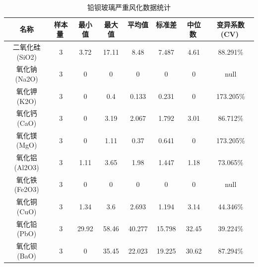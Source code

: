 \documentclass{my_paper}
\begin{document}
\begin{enumerate}
\begin{itemize}
    \begin{longtable}{cccccccc}
    \caption{铅钡玻璃严重风化数据统计}
    \label{index5} \\
    \toprule
        名称                   & 样本量                 & 最小值                  & 最大值                  & 平均值                 & 标准差                 & 中位数                 & 变异系数(CV)            \\
        \midrule
        二氧化硅(SiO2)           & 3                    & 3.72                 & 17.11                & 8.48                 & 7.487                & 4.61                 & 88.291\%             \\
        氧化钠(Na2O)            & 3                    & 0                    & 0                    & 0                    & 0                    & 0                    & null                 \\
        氧化钾(K2O)             & 3                    & 0                    & 0.4                  & 0.133                & 0.231                & 0                    & 173.205\%            \\
        氧化钙(CaO)             & 3                    & 0                    & 3.19                 & 2.067                & 1.792                & 3.01                 & 86.712\%             \\
        氧化镁(MgO)             & 3                    & 0                    & 1.11                 & 0.37                 & 0.641                & 0                    & 173.205\%            \\
        氧化铝(Al2O3)           & 3                    & 1.11                 & 3.65                 & 1.98                 & 1.447                & 1.18                 & 73.065\%             \\
        氧化铁(Fe2O3)           & 3                    & 0                    & 0                    & 0                    & 0                    & 0                    & null                 \\
        氧化铜(CuO)             & 3                    & 1.34                 & 3.6                  & 2.693                & 1.194                & 3.14                 & 44.346\%             \\
        氧化铅(PbO)             & 3                    & 29.92                & 58.46                & 40.277               & 15.798               & 32.45                & 39.224\%             \\
        氧化钡(BaO)             & 3                    & 0                    & 35.45                & 22.023               & 19.225               & 30.62                & 87.294\%             \\

\end{longtable}
\end{itemize}
\end{enumerate}
\end{document}
